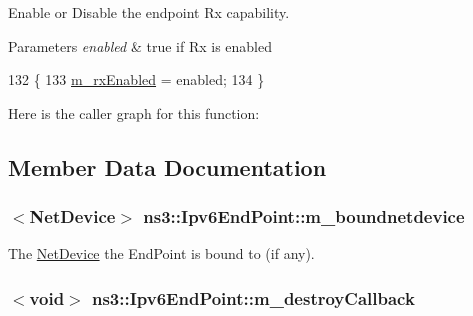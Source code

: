 Enable or Disable the endpoint Rx capability. 


\begin{DoxyParams}{Parameters}
{\em enabled} & true if Rx is enabled \\
\hline
\end{DoxyParams}

\begin{DoxyCode}
132 \{
133   \hyperlink{classns3_1_1Ipv6EndPoint_a63d3381b11d213f97bf47c935eeb4cd7}{m\_rxEnabled} = enabled;
134 \}
\end{DoxyCode}


Here is the caller graph for this function\+:




\subsection{Member Data Documentation}
\subsubsection[{\texorpdfstring{m\+\_\+boundnetdevice}{m_boundnetdevice}}]{$<${\bf Net\+Device}$>$ ns3\+::\+Ipv6\+End\+Point\+::m\+\_\+boundnetdevice\hspace{0.3cm}{\ttfamily [private]}}\hypertarget{classns3_1_1Ipv6EndPoint_ada6134b53ad120cfac037b645fb0b081}{}\label{classns3_1_1Ipv6EndPoint_ada6134b53ad120cfac037b645fb0b081}


The \hyperlink{classns3_1_1NetDevice}{Net\+Device} the End\+Point is bound to (if any). 

\subsubsection[{\texorpdfstring{m\+\_\+destroy\+Callback}{m_destroyCallback}}]{$<$void$>$ ns3\+::\+Ipv6\+End\+Point\+::m\+\_\+destroy\+Callback\hspace{0.3cm}{\ttfamily [private]}}\hypertarget{classns3_1_1Ipv6EndPoint_a77be85cf92f9ad80c0578f4a9dd1b379}{}\label{classns3_1_1Ipv6EndPoint_a77be85cf92f9ad80c0578f4a9dd1b379}


